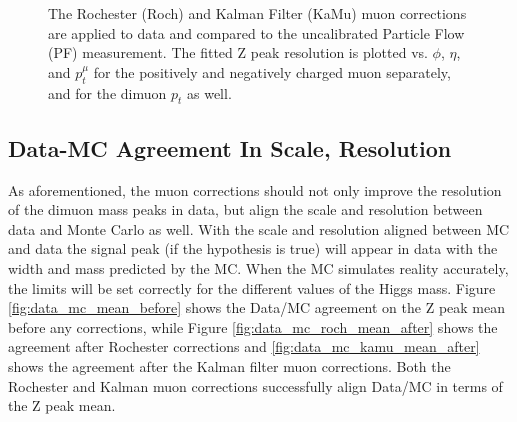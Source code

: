 \begin{figure}[!h]
  \caption[Rochester and Kalman filter muon corrections on the Z peak resolution in data.]
   {The Rochester (Roch) and Kalman Filter (KaMu) muon corrections are applied to data and compared to the uncalibrated Particle Flow (PF) measurement. The fitted Z peak resolution is plotted  vs. $\phi$, $\eta$, and $p_t^\mu$ for the positively and negatively charged muon separately, and for the dimuon $p_t$ as well.}
  \label{fig:net_data_mu_calib_res}
\end{figure}

\FloatBarrier
\subsection{Data-MC Agreement In Scale, Resolution}

As aforementioned, the muon corrections should not only improve the resolution of the dimuon mass peaks in data, but align the scale and resolution between data and Monte Carlo as well. With the scale and resolution aligned between MC and data the signal peak (if the hypothesis is true) will appear in data with the width and mass predicted by the MC. When the MC simulates reality accurately, the limits will be set correctly for the different values of the Higgs mass. Figure \ref{fig:data_mc_mean_before} shows the Data/MC agreement on the Z peak mean before any corrections, while Figure \ref{fig:data_mc_roch_mean_after} shows the agreement after Rochester corrections and \ref{fig:data_mc_kamu_mean_after} shows the agreement after the Kalman filter muon corrections. Both the Rochester and Kalman muon corrections successfully align Data/MC in terms of the Z
peak mean.
